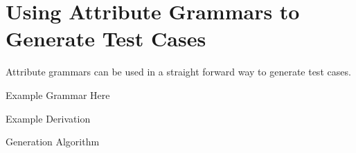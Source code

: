 
\section{Using Attribute Grammars to Generate Test Cases}
\label{attrgram}

Attribute grammars can be used in a straight forward way to generate test cases. 

Example Grammar Here

Example Derivation

Generation Algorithm


